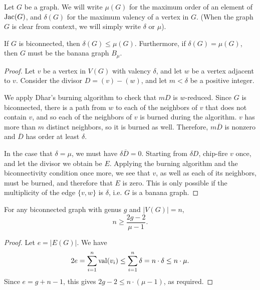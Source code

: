 \documentclass{amsart}
\begin{document}
\begin{defn}
  Let $G$ be a graph. We will write $\mu(G)$ for the maximum order of
  an element of $\operatorname{Jac}(G)$, and $\delta(G)$ for the maximum valency of
  a vertex in $G$. (When the graph $G$ is clear from context, we will
  simply write $\delta$ or $\mu$).
\end{defn}

\begin{lem}
  \label{lem:delta_le_mu}
  If $G$ is biconnected, then $\delta(G) \le \mu(G)$. Furthermore, if
  $\delta(G) = \mu(G)$, then $G$ must be the banana graph $B_\mu$.
\end{lem}
\begin{proof}
  Let $v$ be a vertex in $V(G)$ with valency $\delta$, and let $w$ be
  a vertex adjacent to $v$. Consider the divisor $D = (v) -
  (w)$, and let $m < \delta$ be a positive integer. 

  We apply Dhar's burning algorithm to check that $mD$ is
  $w$-reduced. Since $G$ is biconnected, there is a path from $w$ to
  each of the neighbors of $v$ that does not contain $v$, and so each
  of the neighbors of $v$ is burned during the algorithm. $v$ has more
  than $m$ distinct neighbors, so it is burned as well. Therefore,
  $m\overline{D}$ is nonzero and $\overline{D}$ has order at least
  $\delta$.

  In the case that $\delta = \mu$, we must have $\delta\overline{D} =
  0$. Starting from $\delta D$, chip-fire $v$ once, and let the
  divisor we obtain be $E$. Applying the burning algorithm and the
  biconnectivity condition once more, we see that $v$, as well as each
  of its neighbors, must be burned, and therefore that $E$ is
  zero. This is only possible if the multiplicity of the edge
  $\{v,w\}$ is $\delta$, i.e. $G$ is a banana graph.
\end{proof}

\begin{cor}
  \label{cor:genus_v_mu}
  For any biconnected graph with genus $g$ and $|V(G)| = n$,
  \begin{equation*}
    n \ge \frac{2g - 2}{\mu - 1}.
  \end{equation*}
\end{cor}
\begin{proof}
  Let $e = |E(G)|$. We have 
  \begin{equation*}
    2e = \sum_{i=1}^n \operatorname{val}(v_i) \le \sum_{i=1}^n \delta = n \cdot \delta
    \le n \cdot \mu.
  \end{equation*}
  Since $e = g + n - 1$, this gives $2g - 2 \le n \cdot (\mu - 1)$, as
  required.
\end{proof}
\end{document}
